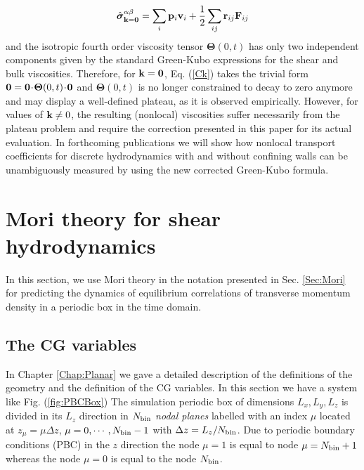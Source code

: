 \documentclass[a4paper,openright,12pt]{book}
\newcommand{\esc}{\!\cdot\!}
\begin{document}
{\begin{align}
  \hat{\boldsymbol{\sigma}}^{\alpha\beta}_{{\bf k}={\bf 0}}=\sum_i{\bf p}_i{\bf v}_i+\frac{1}{2}\sum_{ij}{\bf r}_{ij}{\bf F}_{ ij}
\end{align}
and     the     isotropic     fourth    order     viscosity     tensor
$\boldsymbol{\Theta}(0,t)$ has  only two independent  components given
by  the  standard  Green-Kubo  expressions  for  the  shear  and  bulk
viscosities.  Therefore, for ${\bf  k}={\bf 0}$, Eq.  (\ref{Ck}) takes
the trivial form ${\bf 0}={\bf 0}\esc \boldsymbol{\Theta}(0,t)\esc{\bf
  0}$ and $\boldsymbol{\Theta}(0,t)$ is no longer constrained to decay
to  zero anymore  and may  display a  well-defined plateau,  as it  is
observed  empirically. However,  for values  of ${\bf  k}\neq 0$,  the
resulting (nonlocal) viscosities suffer  necessarily from the plateau
problem and  require the  correction presented in  this paper  for its
actual  evaluation.   In forthcoming  publications  we  will show  how
nonlocal transport  coefficients for discrete hydrodynamics  with and
without confining walls can be unambiguously measured by using the new
corrected Green-Kubo formula.
} %


\section{Mori theory for shear hydrodynamics}
\label{Sec:MoriShearHydro}
In this section, we use Mori theory in the notation presented in Sec. \ref{Sec:Mori} for predicting the dynamics of equilibrium correlations of transverse momentum density in a periodic box in the time domain. 
\subsection{The CG variables}
In Chapter \ref{Chap:Planar} we gave a detailed description of the definitions of the geometry and the definition of the CG variables. In this section we have a system like Fig. (\ref{fig:PBCBox})
The simulation periodic box of  dimensions $L_x,L_y,L_z$ is divided in
its $L_z$  direction in  $N_{\rm bin}$ \textit{nodal  planes} labelled
with   an    index   $\mu$   located   at    $z_\mu=\mu   \Delta   z$,
$\mu=0,\cdots,N_{\rm bin}-1$ with $\Delta  z=L_z/N_{\rm bin}$.  Due to
periodic  boundary conditions  (PBC)  in the  $z$  direction the  node
$\mu=1$ is equal to node  $\mu=N_{\rm bin}+1$ whereas the node $\mu=0$
is equal to the node  $N_{\rm bin}$.  
\end{document}
